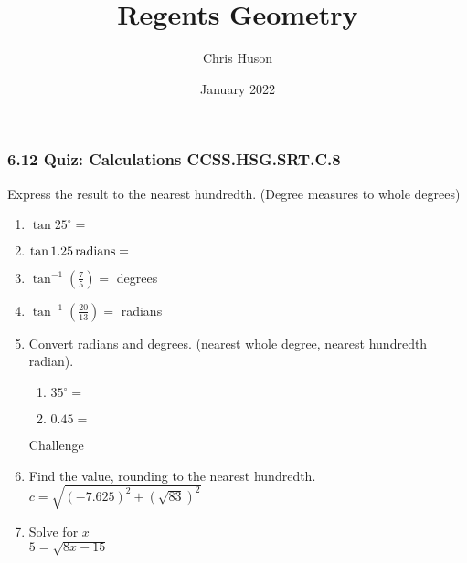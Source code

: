 \documentclass[12pt, twoside]{article}
\title{Regents Geometry}
\author{Chris Huson}
\date{January 2022}
\begin{document}
\subsubsection*{6.12 Quiz: Calculations \hfill CCSS.HSG.SRT.C.8}
Express the result to the nearest hundredth. (Degree measures to whole degrees)
\begin{enumerate}
  \item $\displaystyle \tan 25^\circ = $ \vspace{1cm}
  \item $\displaystyle \tan 1.25 \,\rm{radians}= $ \vspace{1cm}
  \item $\displaystyle \tan^{-1} (\frac{7}{5}) = $ \hspace{2.4  cm} degrees \vspace{1cm}
  \item $\displaystyle \tan^{-1} (\frac{20}{13}) = $ \hspace{2cm} radians \vspace{1cm}
  \item Convert radians and degrees. (nearest whole degree, nearest hundredth radian).\vspace{.25cm}
  \begin{multicols}{2}
    \begin{enumerate}
      \item $35^\circ = $ \vspace{1cm}
      \item $\displaystyle 0.45 =$ \vspace{1cm}
    \end{enumerate}
  \end{multicols} \vspace{1cm}


Challenge
\item Find the value, rounding to the nearest hundredth.\\[0.25cm]
$c=\sqrt{(-7.625)^2+(\sqrt{83})^2}$
\vspace{2cm}

\item Solve for $x$\\[0.25cm]
 $5=\sqrt{8x-15}$

\end{enumerate}
\end{document}
